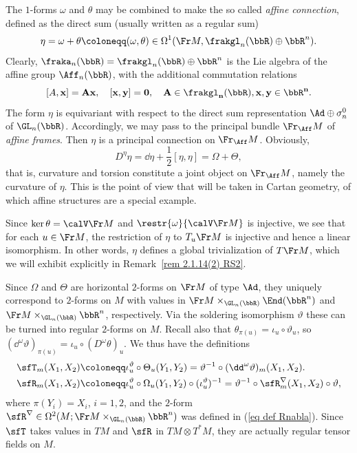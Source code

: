 \begin{rem}\label{rem 2.1.14(1) RS2}
    The $1$-forms $\omega$ and $\theta$  may be combined to make the so called \emph{affine connection}, defined as the direct sum (usually written as a regular sum)
    \[\eta=\omega+\theta\coloneqq (\omega,\theta)\in \Omega^1(\Fr M,\frakgl_n(\bbR)\oplus\bbR^n).\]
    Clearly, $\fraka_n(\bbR)=\frakgl_n(\bbR)\oplus \bbR^n$ is the Lie algebra of the affine group $\Aff_n(\bbR)$, with the additional commutation relations
    \[[A,\bf{x}]=A\bf{x},\quad [\bf{x},\bf{y}]=0,\quad A\in\frakgl_n(\bbR),\bf{x},\bf{y}\in\bbR^n.\]
    The form $\eta$ is equivariant with respect to the direct sum representation $\Ad\oplus \sigma_n^0$ of $\GL_n(\bbR)$. Accordingly, we may pass to the principal bundle $\Fr_{\Aff} M$ of \emph{affine frames}. Then $\eta$ is a principal connection on $\Fr_{\Aff}M$. Obviously,
    \[D^\eta\eta=\dd \eta+\frac12[\eta,\eta]=\Omega+\Theta,\]
    that is, curvature and torsion constitute a joint object on $\Fr_{\Aff} M$, namely the curvature of $\eta$. This is the point of view that will be taken in Cartan geometry, of which affine structures are a special example.

    Since $\ker\theta=\calV \Fr M$ and $\restr{\omega}{\calV \Fr M}$ is injective, we see that for each $u\in\Fr M$, the restriction of $\eta$ to $T_u \Fr M$ is injective and hence a linear isomorphism. In other words, $\eta$ defines a global trivialization of $T\Fr M$, which we will exhibit explicitly in Remark~\ref{rem 2.1.14(2) RS2}.
\end{rem}

Since $\Omega$ and $\Theta$ are horizontal $2$-forms on $\Fr M$ of type $\Ad$, they uniquely correspond to $2$-forms on $M$ with values in $\Fr M\times_{\GL_n(\bbR)}\End(\bbR^n)$ and $\Fr M\times_{\GL_n(\bbR)}\bbR^n$, respectively. Via the soldering isomorphism $\vartheta$ these can be turned into regular $2$-forms on $M$. Recall also that $\theta_{\pi(u)}=\iota_u\circ \vartheta_u$, so $(\dd^\omega \vartheta)_{\pi(u)}=\iota_u\circ (D^\omega\theta)_u$. We thus have the definitions
\begin{align}
    \sfT_m(X_1,X_2)\coloneqq &\iota_u^\vartheta\circ \Theta_u(Y_1,Y_2)=\vartheta^{-1}\circ (\dd^\omega \vartheta)_m(X_1,X_2).\\
    \sfR_m(X_1,X_2)\coloneqq & \iota_u^\vartheta\circ \Omega_u(Y_1,Y_2)\circ (\iota_u^\vartheta)^{-1}=\vartheta^{-1}\circ \sfR^\nabla_m(X_1,X_2)\circ \vartheta,
\end{align}
where $\pi(Y_i)=X_i$, $i=1,2$, and the $2$-form $\sfR^\nabla\in\Omega^2(M;\Fr M\times_{\GL_n(\bbR)}\bbR^n)$ was defined in (\ref{eq def Rnabla}). Since $\sfT$ takes values in $TM$ and $\sfR$ in $TM\otimes T^\ast M$, they are actually regular tensor fields on $M$.

